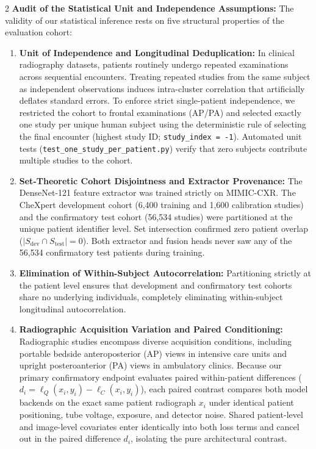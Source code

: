 \documentclass[10pt,a4paper,twoside]{article}
\begin{document}
\begin{multicols}{2}
\noindent\textbf{Audit of the Statistical Unit and Independence Assumptions:} The validity of our statistical inference rests on five structural properties of the evaluation cohort:
\begin{enumerate}
  \setlength{\itemsep}{1pt}
  \setlength{\parskip}{0pt}
  \item \textbf{Unit of Independence and Longitudinal Deduplication:} In clinical radiography datasets, patients routinely undergo repeated examinations across sequential encounters. Treating repeated studies from the same subject as independent observations induces intra-cluster correlation that artificially deflates standard errors. To enforce strict single-patient independence, we restricted the cohort to frontal examinations (AP/PA) and selected exactly one study per unique human subject using the deterministic rule of selecting the final encounter (highest study ID; \texttt{study\_index = -1}). Automated unit tests (\texttt{test\_one\_study\_per\_patient.py}) verify that zero subjects contribute multiple studies to the cohort.
  \item \textbf{Set-Theoretic Cohort Disjointness and Extractor Provenance:} The DenseNet-121 feature extractor was trained strictly on MIMIC-CXR. The CheXpert development cohort (6,400 training and 1,600 calibration studies) and the confirmatory test cohort (56,534 studies) were partitioned at the unique patient identifier level. Set intersection confirmed zero patient overlap ($|S_{\text{dev}} \cap S_{\text{test}}| = 0$). Both extractor and fusion heads never saw any of the 56,534 confirmatory test patients during training.
  \item \textbf{Elimination of Within-Subject Autocorrelation:} Partitioning strictly at the patient level ensures that development and confirmatory test cohorts share no underlying individuals, completely eliminating within-subject longitudinal autocorrelation.
  \item \textbf{Radiographic Acquisition Variation and Paired Conditioning:} Radiographic studies encompass diverse acquisition conditions, including portable bedside anteroposterior (AP) views in intensive care units and upright posteroanterior (PA) views in ambulatory clinics. Because our primary confirmatory endpoint evaluates paired within-patient differences ($d_i = \ell_{Q}(x_i, y_i) - \ell_{C}(x_i, y_i)$), each paired contrast compares both model backends on the exact same patient radiograph $x_i$ under identical patient positioning, tube voltage, exposure, and detector noise. Shared patient-level and image-level covariates enter identically into both loss terms and cancel out in the paired difference $d_i$, isolating the pure architectural contrast.

\end{enumerate}
\end{multicols}
\end{document}
